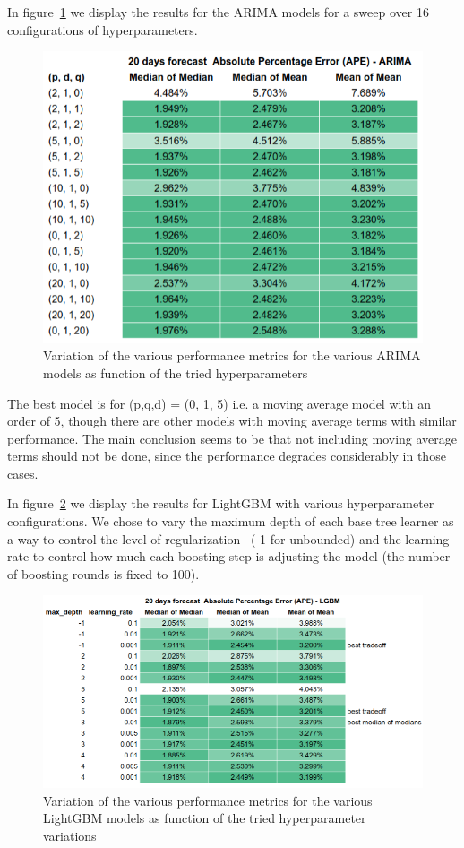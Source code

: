 \documentclass[10pt]{article}
\begin{document}
In figure~{\ref{176774}} we display the results for the
ARIMA models for a sweep over 16 configurations of hyperparameters.~
\begin{figure}[H]
\begin{center}
\includegraphics[width=0.70\columnwidth]{figures/screenshot4/screenshot}
\caption{{Variation of the various performance metrics for the various ARIMA
models as function of the tried hyperparameters~
{\label{176774}}%
}}
\end{center}
\end{figure}

The best model is for (p,q,d) = (0, 1, 5) i.e. a moving average model
with an order of 5, though there are other models with moving average
terms with similar performance. The main conclusion seems to be that not
including moving average terms should not be done, since the performance
degrades considerably in those cases.~~

In figure~{\ref{728131}} we display the results for
LightGBM with various hyperparameter configurations. We chose to vary
the maximum depth of each base tree learner as a way to control the
level of regularization~ (-1 for unbounded) and the learning rate to
control how much each boosting step is adjusting the model (the number
of boosting rounds is fixed to 100).~~
\begin{figure}[H]
\begin{center}
\includegraphics[width=0.98\columnwidth]{figures/screenshot61/screenshot61}
\caption{{Variation of the various performance metrics for the various LightGBM
models as function of the tried hyperparameter variations
{\label{728131}}%
}}
\end{center}
\end{figure}
\end{document}
